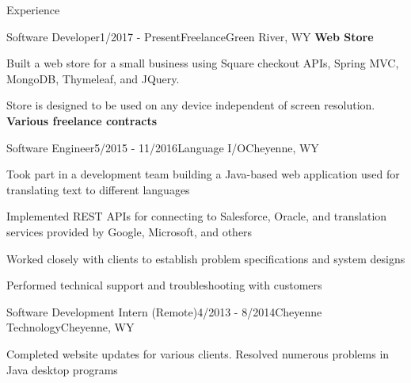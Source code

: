 \documentclass{resume} %
\begin{document}
\begin{rSection}{Experience}
	
	\begin{rSubEmploymentSection}{Software Developer}{1/2017 - Present}{Freelance}{Green River, WY}
		{\bf Web Store}
		\item Built a web store for a small business using Square checkout APIs, Spring MVC, MongoDB, Thymeleaf, and JQuery. 
		\item Store is designed to be used on any device independent of screen resolution. \\
		{\bf Various freelance contracts}
	\end{rSubEmploymentSection}	
	
	\begin{rSubEmploymentSection}{Software Engineer}{5/2015 - 11/2016}{Language I/O}{Cheyenne, WY}
		\item Took part in a development team building a Java-based web application used for translating text to different languages
		\item Implemented REST APIs for connecting to Salesforce, Oracle, and translation services provided by Google, Microsoft, and others
		\item Worked closely with clients to establish problem specifications and system designs
		\item Performed technical support and troubleshooting with customers
	\end{rSubEmploymentSection}
		
	\begin{rSubEmploymentSection}{Software Development Intern (Remote)}{4/2013 - 8/2014}{Cheyenne Technology}{Cheyenne, WY}
		\item Completed website updates for various clients. Resolved numerous problems in Java desktop programs
	\end{rSubEmploymentSection}
		

\end{rSection}
\end{document}
